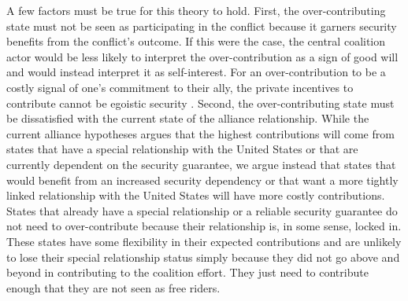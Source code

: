 \documentclass[12pt,letterpaper]{article}
\begin{document}
		A few factors must be true for this theory to hold. First, the over-contributing state must not be seen as participating in the conflict because it garners security benefits from the conflict's outcome. If this were the case, the central coalition actor would be less likely to interpret the over-contribution as a sign of good will and would instead interpret it as self-interest. For an over-contribution to be a costly signal of one's commitment to their ally, the private incentives to contribute cannot be egoistic security \citep{davidson_americaallieswar_2011}. Second, the over-contributing state must be dissatisfied with the current state of the alliance relationship.  While the current alliance hypotheses argues that the highest contributions will come from states that have a special relationship with the United States or that are currently dependent on the security guarantee, we argue instead that states that would benefit from an increased security dependency or that want a more tightly linked relationship with the United States will have more costly contributions. States that already have a special relationship or a reliable security guarantee do not need to over-contribute because their relationship is, in some sense, locked in. These states have some flexibility in their expected contributions and are unlikely to lose their special relationship status simply because they did not go above and beyond in contributing to the coalition effort. They just need to contribute enough that they are not seen as free riders.
\end{document}
